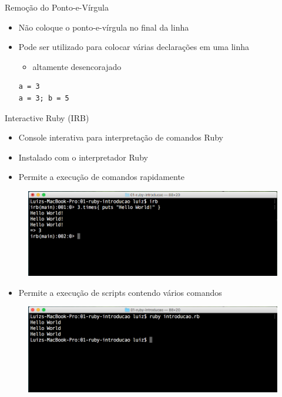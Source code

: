 \begin{frame}[fragile,t]{Remoção do Ponto-e-Vírgula}
  \begin{itemize}
    \item Não coloque o ponto-e-vírgula no final da linha
    \item Pode ser utilizado para colocar várias declarações em uma linha
    \begin{itemize}
      \item altamente desencorajado
    \end{itemize}
    \begin{lstlisting}[style=RubyInputStyle]
a = 3	
a = 3; b = 5 
    \end{lstlisting}
  \end{itemize}
\end{frame}
\begin{frame}{Interactive Ruby (IRB)}
  \begin{itemize}
    \item Console \alert{interativa} para interpretação de comandos Ruby
    \item Instalado com o interpretador Ruby
    \item Permite a \alert{execução} de comandos rapidamente
  \end{itemize}
  \begin{figure}[hbt]
    \includegraphics[scale=.35]{imagens/ruby-irb.png}
  \end{figure}
\framebreak
  \begin{itemize}
  	\item Permite a \alert{execução} de \alert{scripts} contendo vários comandos
  \end{itemize}
  \begin{figure}[hbt]
    \includegraphics[scale=.35]{imagens/ruby-interpretador.png}
  \end{figure}
\end{frame}
